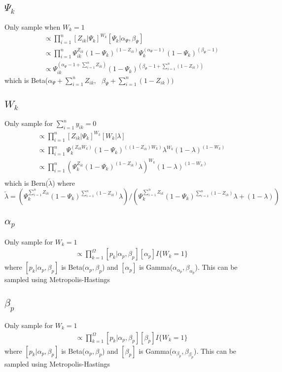 \documentclass[fleqn]{article}
\begin{document}
\subsection{$\Psi_k$}
%
Only sample when $W_k = 1$
%
\begin{align*}
  [\Psi_k | \cdot] & \propto \prod_{i = 1}^n [Z_{ik} | \Psi_k]^{W_k} [\Psi_k | \alpha_\Psi, \beta_\Psi]\\
  & \propto \prod_{i = 1}^n \Psi_{ik}^{Z_{ik}} (1 - \Psi_k)^{(1 - Z_{ik})} \Psi_k^{(\alpha_\Psi - 1)} (1 - \Psi_k)^{(\beta_\Psi - 1)}\\
  & \propto \Psi_{ik}^{(\alpha_\Psi - 1 + \sum_{i = 1}^n Z_{ik})} (1 - \Psi_k)^{(\beta_\Psi - 1 + \sum_{i = 1}^n (1 - Z_{ik}))}
\end{align*}
which is Beta($\alpha_\Psi + \sum_{i = 1}^n Z_{ik}, \mbox{ } \beta_\Psi + \sum_{i = 1}^n (1 - Z_{ik}))$
%
\subsection{$W_k$}
%
Only sample for $\sum_{i = 1}^{n} y_{ik} = 0$
%
\begin{align*}
  [W_k | \cdot] & \propto \prod_{i = 1}^n [Z_{ik} | \Psi_k]^{W_k} [W_k | \lambda]\\
  & \propto \prod_{i = 1}^n \Psi_k^{(Z_{ik} W_k)} (1 - \Psi_k)^{\left( (1 - Z_{ik}) W_k \right)} \lambda^{W_k} (1 - \lambda)^{(1 - W_k)}\\
  & \propto \prod_{i = 1}^n \left(\Psi_k^{Z_{ik}} (1 - \Psi_k)^{(1 - Z_{ik})} \lambda \right)^{W_k} (1 - \lambda)^{(1 - W_k)}\\
\end{align*}
%
which is Bern($\tilde{\lambda}$) where $\tilde{\lambda} = \left(\Psi_k^{\sum_{i = 1}^n Z_{ik}} (1 - \Psi_k)^{\sum_{i = 1}^n (1 - Z_{ik})} \lambda \right) / \left(\Psi_k^{\sum_{i = 1}^n Z_{ik}} (1 - \Psi_k)^{\sum_{i = 1}^n (1 - Z_{ik})} \lambda + (1 - \lambda) \right)$
%
\subsection{$\alpha_p$}
%
Only sample for $W_k = 1$
%
\begin{align*}
  [\alpha_p | \cdot] & \propto \prod_{k = 1}^\Omega [p_k | \alpha_p, \beta_p] [\alpha_p] I\{W_k = 1\}
\end{align*}
where $[p_k | \alpha_p, \beta_p]$ is Beta($\alpha_p, \beta_p$) and $[\alpha_p]$ is Gamma($\alpha_{\alpha_p}, \beta_{\alpha_p}$). This can be sampled using Metropolis-Hastings
%
\subsection{$\beta_p$}
%
Only sample for $W_k = 1$
%
\begin{align*}
  [\beta_p | \cdot] & \propto \prod_{k = 1}^\Omega [p_k | \alpha_p, \beta_p] [\beta_p] I\{W_k = 1\}
\end{align*}
where $[p_k | \alpha_p, \beta_p]$ is Beta($\alpha_p, \beta_p$) and $[\beta_p]$ is Gamma($\alpha_{\beta_p}, \beta_{\beta_p}$). This can be sampled using Metropolis-Hastings
%
\end{document}
